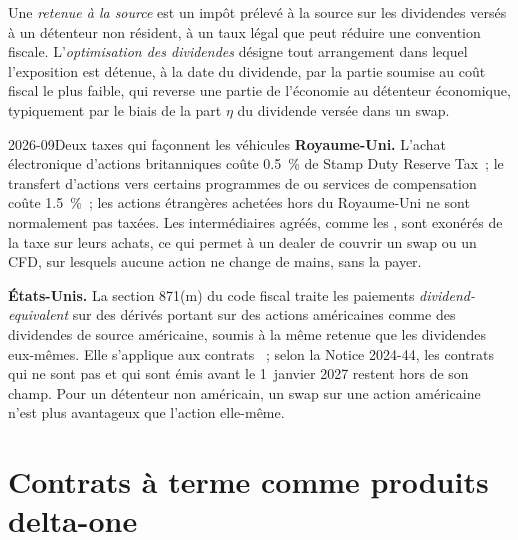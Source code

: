 \begin{definition}\label{def:m1:delta-one-instruments:wht}
Une \emph{retenue à la source} est un impôt prélevé à la source
sur les dividendes versés à un détenteur non résident, à un taux légal que peut réduire une
convention fiscale. L'\emph{optimisation des dividendes} désigne tout
arrangement dans lequel l'exposition est détenue, à la date du dividende, par la
partie soumise au coût fiscal le plus faible, qui reverse une partie de l'économie au
détenteur économique, typiquement par le biais de la part $\eta$ du dividende versée dans
un swap.
\end{definition}

\begin{dated}{2026-09}{Deux taxes qui façonnent les véhicules}\label{dat:m1:delta-one-instruments:tax}
\textbf{Royaume-Uni.} L'achat électronique d'actions britanniques coûte 0.5~\% de Stamp
Duty Reserve Tax~; le transfert d'actions vers certains programmes de  ou
services de compensation coûte 1.5~\%~; les actions étrangères achetées hors du Royaume-Uni ne sont
normalement pas taxées. Les intermédiaires agréés, comme les , sont
exonérés de la taxe sur leurs achats, ce qui permet à un dealer de couvrir un
swap ou un CFD, sur lesquels aucune action ne change de mains, sans la payer.

\textbf{États-Unis.} La section 871(m) du code fiscal traite les paiements
\emph{dividend-equivalent} sur des dérivés portant sur des actions américaines comme des dividendes de source américaine,
soumis à la même retenue que les dividendes eux-mêmes. Elle
s'applique aux contrats ~; selon la Notice 2024-44, les contrats qui ne sont pas
 et qui sont émis avant le 1~janvier 2027 restent hors de son champ. Pour un
détenteur non américain, un swap sur une action américaine n'est plus avantageux que l'action elle-même.
\end{dated}

\section{Contrats à terme comme produits delta-one}

